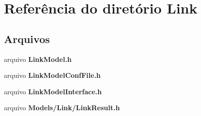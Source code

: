 \section{Referência do diretório Link}
\label{dir_f9a9e9d463849a3806c889aaa6dca758}
\subsection*{Arquivos}
\begin{DoxyCompactItemize}
\item 
arquivo {\bf Link\+Model.\+h}
\item 
arquivo {\bf Link\+Model\+Conf\+File.\+h}
\item 
arquivo {\bf Link\+Model\+Interface.\+h}
\item 
arquivo {\bf Models/\+Link/\+Link\+Result.\+h}
\end{DoxyCompactItemize}
